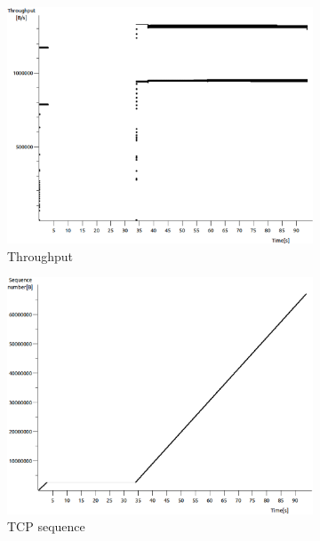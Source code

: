 \documentclass[conference,a4paper]{../../sty/IEEEtran}
\begin{document}
\begin{figure}
 \centering
 \begin{subfigure}[b]{0.2\textwidth}
  \includegraphics[width=\textwidth]{s3-0_thru}
  \caption{Throughput}
 \end{subfigure}
 \begin{subfigure}[b]{0.2\textwidth}
  \includegraphics[width=\textwidth]{s3-0_seq}
  \caption{TCP sequence}
 \end{subfigure}
 \begin{subfigure}[b]{0.2\textwidth}

\end{subfigure}
\end{figure}
\end{document}
